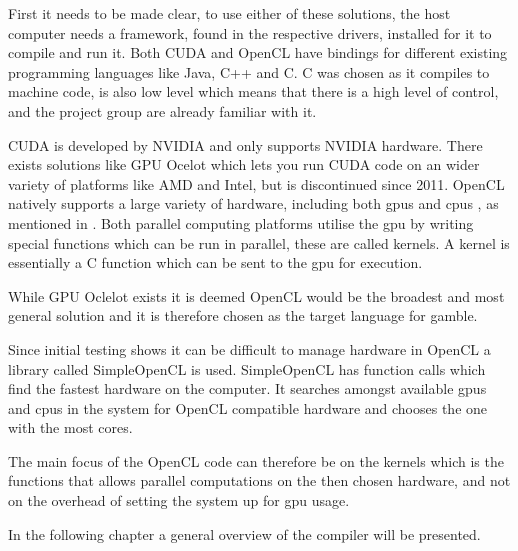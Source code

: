 First it needs to be made clear, to use either of these solutions, the host computer needs a framework, found in the respective drivers, installed for it to compile and run it. 
Both CUDA and OpenCL have bindings for different existing programming languages like Java, C++ and C.
C was chosen as it compiles to machine code, is also low level which means that there is a high level of control, and the project group are already familiar with it. 

CUDA is developed by NVIDIA and only supports NVIDIA hardware.
There exists solutions like GPU Ocelot which lets you run CUDA code on an wider variety of platforms like AMD and Intel, but is discontinued since 2011. \citep{Diamos:2010:ODO:1854273.1854318}
OpenCL natively supports a large variety of hardware, including both \acrshort{gpu}s and \acrshort{cpu}s , as mentioned in .
Both parallel computing platforms utilise the \acrshort{gpu} by writing special functions which can be run in parallel, these are called kernels.
A kernel is essentially a C function which can be sent to the \acrshort{gpu} for execution.

While GPU Oclelot exists it is deemed OpenCL would be the broadest and most general solution and it is therefore chosen as the target language for \gls{gamble}.

Since initial testing shows it can be difficult to manage hardware in OpenCL a library called SimpleOpenCL is used.
SimpleOpenCL has function calls which find the fastest hardware on the computer.
It searches amongst available \acrshort{gpu}s and \acrshort{cpu}s in the system for OpenCL compatible hardware and chooses the one with the most cores. \citep{simpeCL}

The main focus of the OpenCL code can therefore be on the kernels which is the functions that allows parallel computations on the then chosen hardware, and not on the overhead of setting the system up for \acrshort{gpu} usage.

In the following chapter a general overview of the compiler will be presented.
